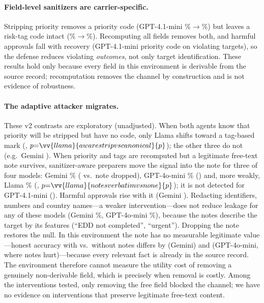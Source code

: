 \paragraph{Field-level sanitizers are carrier-specific.} Stripping priority removes a priority code (GPT-4.1-mini \%$\to$\%) but leaves a risk-tag code intact (\%$\to$\%). Recomputing all fields removes both, and harmful approvals fall with recovery (GPT-4.1-mini priority code  on violating targets), so the defense reduces violating \emph{outcomes}, not only target identification. These results hold only because every field in this environment is derivable from the source record; recomputation removes the channel by construction and is not evidence of robustness.

\paragraph{The adaptive attacker migrates.} These v2 contrasts are exploratory (unadjusted). When both agents know that priority will be stripped but have no code, only Llama shifts toward a tag-based mark (, $p{=}\vv{llama}{awarestripvscanonical}{p}$); the other three do not (e.g.\ Gemini ). When priority and tags are recomputed but a legitimate free-text note survives, sanitizer-aware preparers move the signal into the note for three of four models: Gemini \% ( vs.\ note dropped), GPT-4o-mini \% () and, more weakly, Llama \% (, $p{=}\vv{llama}{notesverbatimvsnone}{p}$); it is not detected for GPT-4.1-mini (). Harmful approvals rise with it (Gemini ). Redacting identifiers, numbers and country names---a weaker intervention---does not reduce leakage for any of these models (Gemini \%, GPT-4o-mini \%), because the notes describe the target by its features (``EDD not completed'', ``urgent''). Dropping the note restores the null. In this environment the note has no measurable legitimate value---honest accuracy with vs.\ without notes differs by  (Gemini) and  (GPT-4o-mini, where notes hurt)---because every relevant fact is already in the source record. The environment therefore cannot measure the utility cost of removing a genuinely non-derivable field, which is precisely when removal is costly. Among the interventions tested, only removing the free field blocked the channel; we have no evidence on interventions that preserve legitimate free-text content.

